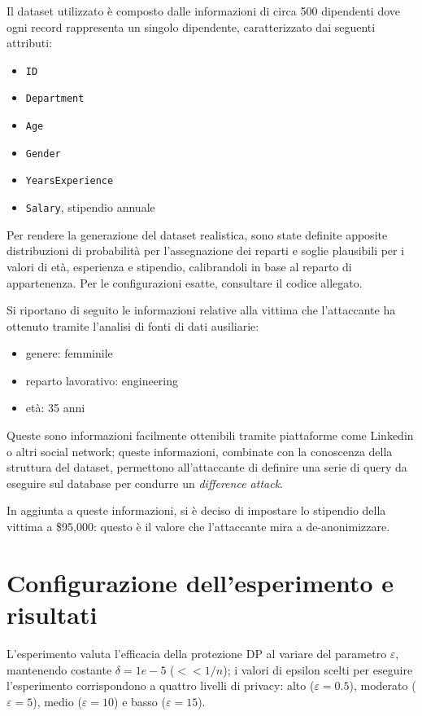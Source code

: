 Il dataset utilizzato è composto dalle informazioni di circa 500 dipendenti dove ogni record rappresenta un singolo dipendente, caratterizzato dai seguenti attributi:
\begin{itemize}
    \item \texttt{ID}
    \item \texttt{Department}
    \item \texttt{Age}
    \item \texttt{Gender}
    \item \texttt{YearsExperience}
    \item \texttt{Salary}, stipendio annuale
\end{itemize}

Per rendere la generazione del dataset realistica, sono state definite apposite distribuzioni di probabilità per l'assegnazione dei reparti e soglie plausibili per i valori di età, esperienza e stipendio, calibrandoli in base al reparto di appartenenza. Per le configurazioni esatte, consultare il codice allegato.

Si riportano di seguito le informazioni relative alla vittima che l'attaccante ha ottenuto tramite l'analisi di fonti di dati ausiliarie:
\begin{itemize}
    \item genere: femminile
    \item reparto lavorativo: engineering
    \item età: 35 anni
\end{itemize}
Queste sono informazioni facilmente ottenibili tramite piattaforme come Linkedin o altri social network; queste informazioni, combinate con la conoscenza della struttura del dataset, permettono all'attaccante di definire una serie di query da eseguire sul database per condurre un \textit{difference attack}.

In aggiunta a queste informazioni, si è deciso di impostare lo stipendio della vittima a \$95,000: questo è il valore che l'attaccante mira a de-anonimizzare.

\section{Configurazione dell'esperimento e risultati}

L'esperimento valuta l'efficacia della protezione DP al variare del parametro $\varepsilon$, mantenendo costante $\delta = 1e-5$ ($<< 1/n$); i valori di epsilon scelti per eseguire l'esperimento corrispondono a quattro livelli di privacy: alto ($\varepsilon = 0.5$), moderato ($\varepsilon = 5$), medio ($\varepsilon = 10$) e basso ($\varepsilon = 15$).

